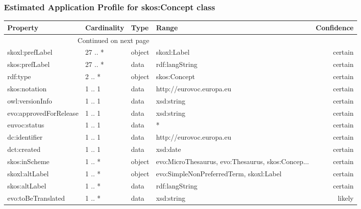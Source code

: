 \documentclass[10pt,a4paper,titlepage,final]{article}
\begin{document}
\subsubsection{Estimated Application Profile for skos:Concept class}
\begin{tabularx}{\textwidth}{lllXr}
\toprule
               Property & Cardinality &    Type &                                              Range & Confidence \\
\midrule
\endhead
\midrule
\multicolumn{3}{r}{{Continued on next page}} \\
\midrule
\endfoot

\bottomrule
\endlastfoot
        skoxl:prefLabel &     27 .. * &  object &                                        skoxl:Label &    certain \\
         skos:prefLabel &     27 .. * &    data &                                     rdf:langString &    certain \\
               rdf:type &      2 .. * &  object &                                       skos:Concept &    certain \\
          skos:notation &      1 .. 1 &    data &                           http://eurovoc.europa.eu &    certain \\
        owl:versionInfo &      1 .. 1 &    data &                                         xsd:string &    certain \\
 evo:approvedForRelease &      1 .. 1 &    data &                                         xsd:string &    certain \\
           euvoc:status &      1 .. 1 &    data &                                                  * &    certain \\
          dc:identifier &      1 .. 1 &    data &                           http://eurovoc.europa.eu &    certain \\
            dct:created &      1 .. 1 &    data &                                           xsd:date &    certain \\
          skos:inScheme &      1 .. * &  object &  evo:MicroThesaurus, evo:Thesaurus, skos:Concep... &    certain \\
         skoxl:altLabel &      1 .. * &  object &            evo:SimpleNonPreferredTerm, skoxl:Label &    certain \\
          skos:altLabel &      1 .. * &    data &                                     rdf:langString &    certain \\
     evo:toBeTranslated &      1 .. * &    data &                                         xsd:string &     likely \\

\end{tabularx}
\end{document}
